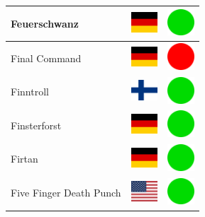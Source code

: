 \documentclass[12pt, a4paper, twoside]{report}
\begin{document}
\begin{center}
\begin{longtable}{|p{5cm}|p{2cm}|p{2cm}|}
 Feuerschwanz                                               & \includegraphics[width=1cm]{../img/flags/de} &   \includegraphics[width=1cm]{../likes/y} \\ \hline
 Final Command                                              & \includegraphics[width=1cm]{../img/flags/de} &   \includegraphics[width=1cm]{../likes/n} \\ \hline
 Finntroll                                                  & \includegraphics[width=1cm]{../img/flags/fi} &   \includegraphics[width=1cm]{../likes/y} \\ \hline
 Finsterforst                                               & \includegraphics[width=1cm]{../img/flags/de} &   \includegraphics[width=1cm]{../likes/y} \\ \hline
 Firtan                                                     & \includegraphics[width=1cm]{../img/flags/de} &   \includegraphics[width=1cm]{../likes/y} \\ \hline
 Five Finger Death Punch                                    & \includegraphics[width=1cm]{../img/flags/us} &   \includegraphics[width=1cm]{../likes/y} \\ \hline

\end{longtable}
\end{center}
\end{document}
